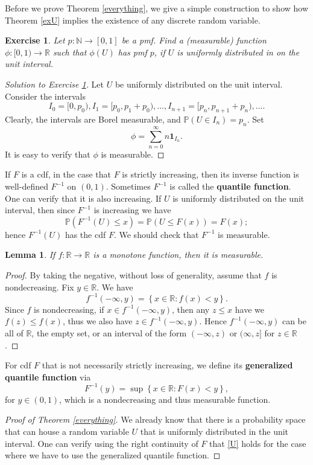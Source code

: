 \documentclass[12pt, reqno]{amsart}
\newtheorem{lemma}[theorem]{Lemma}
\newtheorem{ex}{Exercise}[section]
\newcommand\dff[1]{\textbf{#1}}
\newcommand\ns[1]{ \left\{ {#1} \right\} }
\renewcommand{\P}{{\mathbb P}}  %
\newcommand{\R}{{\mathbb R}}
\newcommand{\N}{{\mathbb N}}
\begin{document}
Before we prove Theorem \ref{everything}, we give a simple construction to show how Theorem \ref{exU} implies the existence of any discrete random variable.  

\begin{ex}  
\label{part}
Let $p:\N \to [0,1]$ be a pmf.  Find a (measurable) function $\phi:[0,1) \to \R$ such that $\phi(U)$ has pmf $p$, if $U$ is uniformly distributed in on the unit interval.

\end{ex}

\begin{proof}[Solution to Exercise \ref{part}]
Let $U$ be uniformly distributed on the unit interval.  Consider the intervals $$I_0=[0, p_0), I_1=[p_0, p_1 +p_0), \ldots, I_{n+1}=[p_n,  p_{n+1} +p_n
), \ldots.$$
Clearly, the intervals are Borel measurable, and $\P(U \in I_n) = p_n$.  Set $$\phi = \sum_{n=0} ^{\infty}  n\mathbf{1}_{I_n}.$$  It is easy to verify that $\phi$ is measurable.  
\end{proof}

If $F$ is a cdf, in the case that $F$ is strictly increasing, then its inverse function is well-defined $F^{-1}$ on $(0, 1)$.   Sometimes $F^{-1}$ is called the \dff{quantile function}.    One can verify that it is also increasing.      If $U$ is uniformly distributed on the unit interval, then 
since $F^{-1}$ is increasing we have 
 \begin{equation}
 \label{U}
   \P(   F^{-1}(U) \leq x) = \P( U \leq F(x)) = F(x);
   \end{equation}
hence $F^{-1}(U)$ has the cdf $F$.  We should check that $F^{-1}$ is measurable. 

\begin{lemma}
If $f: \R \to \R$ is a monotone function, then it is measurable.  
\end{lemma}

\begin{proof}   By taking the negative, without loss of generality, assume that $f$ is nondecreasing.  Fix $ y\in \R$. 
We have 
$$ f^{-1}(-\infty, y) = \ns{x \in \R :  f(x) < y}.$$
Since $f$ is nondecreasing, if $x \in  f^{-1}(-\infty, y) $, then any $z \leq x$ have  we $f(z) \leq f(x)$, thus we  also have $z \in  f^{-1}(-\infty, y) $.  Hence $  f^{-1}(-\infty, y) $ can be all of $\R$, the empty set,  or an  interval of the form $(-\infty, z)$ or $(\infty, z]$ for $z \in \R$. 
%
\end{proof}

For cdf $F$ that is not necessarily strictly increasing, we define its \dff{generalized quantile function} via 
$$ F^{-1}(y) = \sup\ns{ x\in \R:  F(x) < y},$$
for $y \in (0,1)$,  
which is a nondecreasing and thus measurable function. 
\begin{proof}[Proof of Theorem \ref{everything}]
We already know that there is a probability space that can house a random variable $U$ that is uniformly distributed in the unit interval.  One can verify using the right continuity of $F$ that \eqref{U} holds for the case where we have to use the generalized quantile function.
\end{proof}
\end{document}
